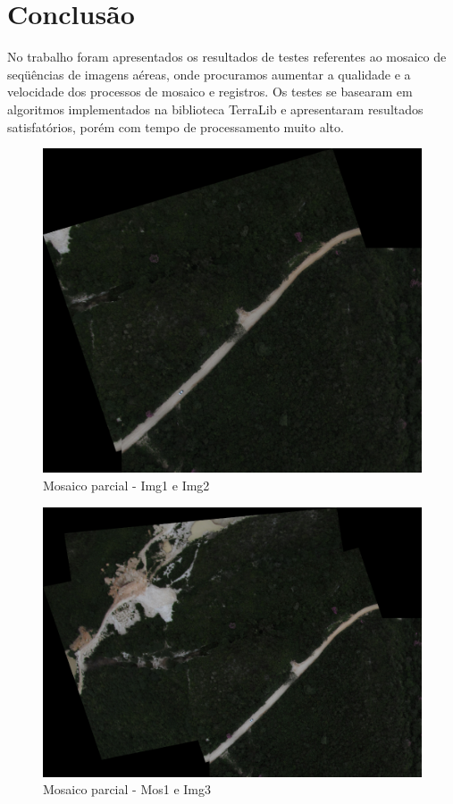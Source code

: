 \documentclass[9pt, a4paper, nofonttune, journal]{IEEEtran}
\begin{document}
\section{Conclusão}
No trabalho foram apresentados os resultados de testes referentes ao mosaico de seqüências de imagens aéreas, onde procuramos aumentar a qualidade e a velocidade dos processos de mosaico e registros. Os testes se basearam em algoritmos implementados na biblioteca TerraLib e apresentaram resultados satisfatórios, porém com tempo de processamento muito alto.




\clearpage

\begin{figure}[!h]
\begin{center}
\includegraphics[scale=0.25]{figuras/Mosaic0}
\caption{Mosaico parcial - Img1 e Img2}
\label{fig:mosaico}
\end{center}
\end{figure}

\begin{figure}[!h]
\begin{center}
\includegraphics[scale=0.25]{figuras/Mosaic2}
\caption{Mosaico parcial - Mos1 e Img3 }
\label{fig:mosaico}
\end{center}
\end{figure}
\end{document}
